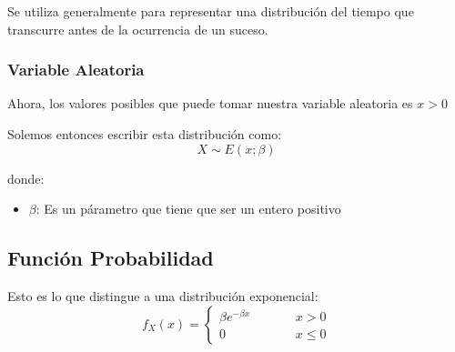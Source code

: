 \documentclass[12pt, fleqn]{report}                             %
\DeclareMathOperator \MegaSpace {\quad \quad}                   %
\theoremstyle{break}                                            %
\begin{document}
                Se utiliza generalmente para representar una distribución del tiempo
                que transcurre antes de la ocurrencia de un suceso.


                \vspace{1em}
                \subsubsection{Variable Aleatoria}

                    Ahora, los valores posibles que puede tomar nuestra variable aleatoria es
                    $x > 0$

                    Solemos entonces escribir esta distribución como:
                    \begin{equation*}
                        X \sim E(x; \beta)
                    \end{equation*}

                    donde:
                    \begin{itemize}
                        \item $\beta$: Es un párametro que tiene que ser un entero positivo
                    \end{itemize}


            \clearpage
            \subsection{Función Probabilidad}

                Esto es lo que distingue a una distribución exponencial:
                \begin{equation*}
                    f_X(x) = 
                        \begin{cases}
                            \beta e^{-\beta x}  \MegaSpace & x > 0           \\
                            0                   \MegaSpace & x \leq 0
                        \end{cases}
                \end{equation*}
                    
\end{document}
